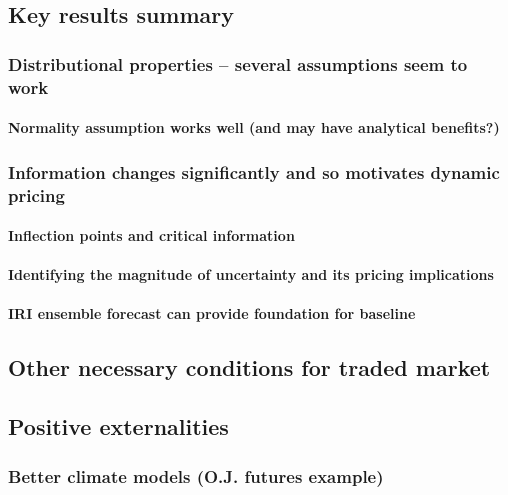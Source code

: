 \documentclass[authoryear]{article}
\begin{document}
\subsection{Key results summary}

\subsubsection{Distributional properties – several assumptions seem to work}

\paragraph{Normality assumption works well (and may have analytical benefits?)}

\subsubsection{Information changes significantly and so motivates dynamic pricing}

\paragraph{Inflection points and critical information}

\paragraph{Identifying the magnitude of uncertainty and its pricing implications}

\paragraph{IRI ensemble forecast can provide foundation for baseline}

\subsection{Other necessary conditions for traded market}

\subsection{Positive externalities}

\subsubsection{Better climate models (O.J. futures example)}



\end{document}
